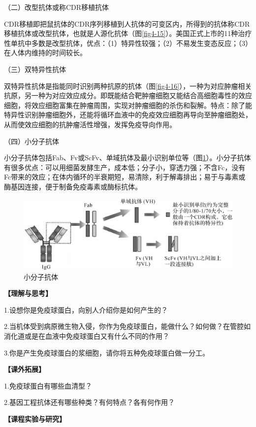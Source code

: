 （二）改型抗体或称CDR移植抗体

CDR移植即把鼠抗体的CDR序列移植到人抗体的可变区内，所得到的抗体称CDR移植抗体或改型抗体，也就是人源化抗体（图\ref{fig4-15}）。美国正式上市的11种治疗性单抗中多数是改型抗体，优点：（1）特异性较强；（2）不易发生变态反应；（3）在人体内维持的时间较长。

（三）双特异性抗体

双特异性抗体是指能同时识别两种抗原的抗体（图\ref{fig4-16}），一种为对应肿瘤相关抗原，另一种为对应效应成分。即既能结合靶肿瘤细胞又能结合高细胞毒性的效应细胞，将效应细胞富集在肿瘤周围，实现对肿瘤细胞的杀伤和裂解。特点：除了能特异性识别肿瘤细胞外，还能将循环血液中的免疫效应细胞再导向至肿瘤细胞处，从而使效应细胞的抗肿瘤活性增强，发挥免疫导向作用。

（四）小分子抗体

小分子抗体包括Fab、Fv或ScFv、单域抗体及最小识别单位等（图\ref{fig4-17}）。小分子抗体有很多优点：可以用细菌发酵生产，成本低；分子小，穿透力强；不含Fc，没有Fc带来的效应；在体内循环的半衰期短，易清除，利于解毒排出；易于与毒素或酶基因连接，便于制备免疫毒素或酶标抗体。

\begin{figure}[!htbp]
 \centering
 \includegraphics{./images/Image00077.jpg}
 \captionsetup{justification=centering}
 \caption{小分子抗体}
 \label{fig4-17}
  \end{figure} 

\noindent\textbf{【理解与思考】}

1.设想你是免疫球蛋白，向别人介绍你是如何产生的？

2.当机体受到病原微生物入侵，你作为免疫球蛋白，能做什么？如何做？在管腔如消化道或是在血液中免疫球蛋白又有什么不同的作用？

3.你是产生免疫球蛋白的浆细胞，请你将五种免疫球蛋白做一分工。

\noindent\textbf{【课外拓展】}

1.免疫球蛋白有哪些血清型？

2.基因工程抗体还有哪些种类？有何特点？各有何作用？

\noindent\textbf{【课程实验与研究】}

